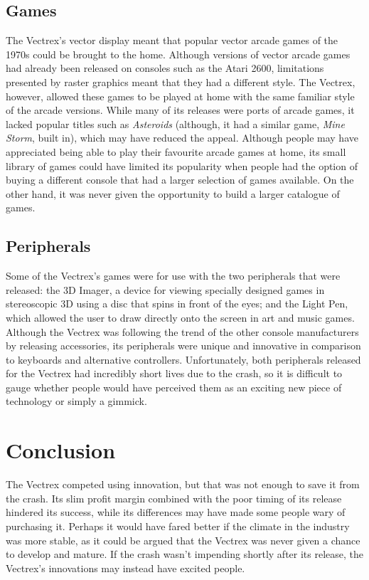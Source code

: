 \documentclass{scrartcl}
\begin{document}
\subsection*{Games}
The Vectrex's vector display meant that popular vector arcade games of the 1970s could be brought to the home. Although versions of vector arcade games had already been released on consoles such as the Atari 2600, limitations presented by raster graphics meant that they had a different style\cite{montfort:random}. The Vectrex, however, allowed these games to be played at home with the same familiar style of the arcade versions. While many of its releases were ports of arcade games, it lacked popular titles such as \textit{Asteroids} (although, it had a similar game, \textit{Mine Storm}, built in)\cite{baer:supercade}, which may have reduced the appeal. Although people may have appreciated being able to play their favourite arcade games at home, its small library of games could have limited its popularity when people had the option of buying a different console that had a larger selection of games available. On the other hand, it was never given the opportunity to build a larger catalogue of games. 


\subsection*{Peripherals} 
Some of the Vectrex's games were for use with the two peripherals that were released: the 3D Imager, a device for viewing specially designed games in stereoscopic 3D using a disc that spins in front of the eyes\cite{zachara:stereo}; and the Light Pen, which allowed the user to draw directly onto the screen in art and music games. Although the Vectrex was following the trend of the other console manufacturers by releasing accessories, its peripherals were unique and innovative in comparison to keyboards and alternative controllers\cite{montfort:beam}. Unfortunately, both peripherals released for the Vectrex had incredibly short lives due to the crash, so it is difficult to gauge whether people would have perceived them as an exciting new piece of technology or simply a gimmick.



\section*{Conclusion}
The Vectrex competed using innovation, but that was not enough to save it from the crash. Its slim profit margin combined with the poor timing of its release hindered its success, while its differences may have made some people wary of purchasing it. Perhaps it would have fared better if the climate in the industry was more stable, as it could be argued that the Vectrex was never given a chance to develop and mature. If the crash wasn't impending shortly after its release, the Vectrex's innovations may instead have excited people.




\end{document}
